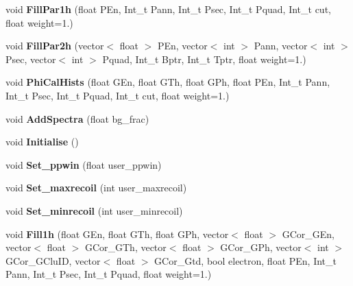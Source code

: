 \begin{DoxyCompactItemize}
void {\bfseries Fill\+Par1h} (float P\+En, Int\+\_\+t Pann, Int\+\_\+t Psec, Int\+\_\+t Pquad, Int\+\_\+t cut, float weight=1.)
\item 
\mbox{\label{classhists_abdb2e69023e9fdd9080bcef611c26125}} 
void {\bfseries Fill\+Par2h} (vector$<$ float $>$ P\+En, vector$<$ int $>$ Pann, vector$<$ int $>$ Psec, vector$<$ int $>$ Pquad, Int\+\_\+t Bptr, Int\+\_\+t Tptr, float weight=1.)
\item 
\mbox{\label{classhists_ab48ef7120a82723ec1db8fde8143d532}} 
void {\bfseries Phi\+Cal\+Hists} (float G\+En, float G\+Th, float G\+Ph, float P\+En, Int\+\_\+t Pann, Int\+\_\+t Psec, Int\+\_\+t Pquad, Int\+\_\+t cut, float weight=1.)
\item 
\mbox{\label{classhists_a52b2233e6775d4a9bf714368101116cb}} 
void {\bfseries Add\+Spectra} (float bg\+\_\+frac)
\item 
\mbox{\label{classhists_a70566f0da5744717becf6a02bc98cb69}} 
void {\bfseries Initialise} ()
\item 
\mbox{\label{classhists_a98cf7d91940c6d77105d07b0783399ee}} 
void {\bfseries Set\+\_\+ppwin} (float user\+\_\+ppwin)
\item 
\mbox{\label{classhists_ae986e831e139c9e7e5a4e327e864484d}} 
void {\bfseries Set\+\_\+maxrecoil} (int user\+\_\+maxrecoil)
\item 
\mbox{\label{classhists_acfb845682216224712565e7b8a1c3ce2}} 
void {\bfseries Set\+\_\+minrecoil} (int user\+\_\+minrecoil)
\item 
\mbox{\label{classhists_a4cc3927b58899125a7691a50101fb902}} 
void {\bfseries Fill1h} (float G\+En, float G\+Th, float G\+Ph, vector$<$ float $>$ G\+Cor\+\_\+\+G\+En, vector$<$ float $>$ G\+Cor\+\_\+\+G\+Th, vector$<$ float $>$ G\+Cor\+\_\+\+G\+Ph, vector$<$ int $>$ G\+Cor\+\_\+\+G\+Clu\+ID, vector$<$ float $>$ G\+Cor\+\_\+\+Gtd, bool electron, float P\+En, Int\+\_\+t Pann, Int\+\_\+t Psec, Int\+\_\+t Pquad, float weight=1.)
\item 
\mbox{\label{classhists_a84e3dd3dc98652844bbfea63652eb280}} 

\end{DoxyCompactItemize}
